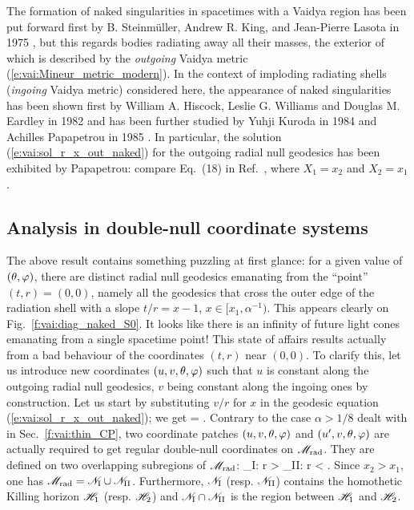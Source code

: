 \begin{hist}
The formation of naked singularities in spacetimes with a Vaidya region
has been put forward first by B. Steinmüller, Andrew R. King, and Jean-Pierre Lasota
in 1975 \cite{SteinmKL75}, but this regards bodies radiating away all their masses, the exterior of which
is described by the \emph{outgoing} Vaidya metric (\ref{e:vai:Mineur_metric_modern}).
In the context of imploding
radiating shells (\emph{ingoing} Vaidya metric) considered here, the appearance of naked singularities
has been shown first by William A. Hiscock, Leslie G. Williams and Douglas M. Eardley in 1982 \cite{HiscoWE82} and has been further studied by
Yuhji Kuroda in 1984 \cite{Kurod84} and Achilles Papapetrou in 1985 \cite{Papap85}. In particular, the solution (\ref{e:vai:sol_r_x_out_naked}) for the
outgoing radial null geodesics has been exhibited by Papapetrou: compare Eq.~(18) in Ref.~\cite{Papap85},
where $X_1=x_2$ and $X_2=x_1$.
\end{hist}

\subsection{Analysis in double-null coordinate systems} \label{s:vai:analysis_double_null}

The above result contains something puzzling at first glance: for a given
value of $(\theta,\varphi)$, there are distinct radial null geodesics emanating
from the ``point'' $(t, r) = (0,0)$, namely all the geodesics that
cross the outer edge of the radiation shell with a slope $t/r = x - 1$,
$x\in [x_1, \alpha^{-1})$. %
This appears clearly on Fig.~\ref{f:vai:diag_naked_S0}.
It looks like there is an infinity of future light cones emanating
from a single spacetime point!
This state of affairs results actually from a bad behaviour of the coordinates
$(t, r)$ near $(0,0)$. To clarify this, let us introduce new coordinates
$(u, v, \theta, \varphi)$ such that $u$ is constant along the
outgoing radial null geodesics, $v$ being constant along
the ingoing ones by construction. Let us start by substituting $v/r$ for $x$ in
the geodesic equation (\ref{e:vai:sol_r_x_out_naked}); we get
\be \label{e:vai:v_r_out_naked}
     = .
\ee
Contrary to the case $\alpha > 1/8$ dealt with in Sec.~\ref{f:vai:thin_CP},
two coordinate patches $(u,v,\theta,\varphi)$ and $(u',v,\theta,\varphi)$ are actually
required to get regular double-null coordinates on $\mathscr{M}_{\rm rad}$. They are defined
on two overlapping subregions of $\mathscr{M}_{\rm rad}$:
\be \label{e:vai:def_NI_NII}
    _{\rm I}: r >  \qand
    _{\rm II}: r <  .
\ee
Since $x_2 > x_1$, one has
$\mathscr{M}_{\rm rad} = \mathscr{N}_{\rm I} \cup \mathscr{N}_{\rm II}$.
Furthermore, $\mathscr{N}_{\rm I}$ (resp.  $\mathscr{N}_{\rm II}$)
contains the homothetic Killing horizon $\mathscr{H}_1$ (resp. $\mathscr{H}_2$)
and $\mathscr{N}_{\rm I} \cap \mathscr{N}_{\rm II}$ is the region
between $\mathscr{H}_1$ and $\mathscr{H}_2$.

